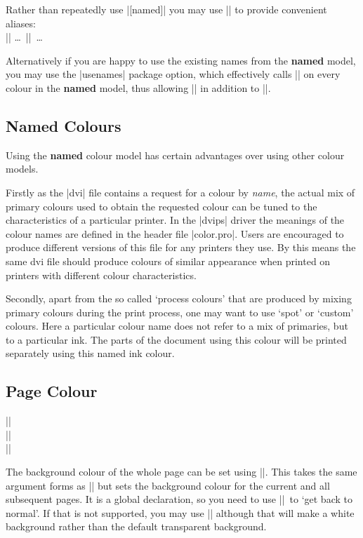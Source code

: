 Rather than repeatedly use |[named]| you may use |\definecolor| to
provide convenient aliases:\\
||
     \ldots\ |\color{myred}|\ \ldots

Alternatively if you are happy to use the existing names from the
\textbf{named} model, you may use the |usenames| package option, which
effectively calls |\definecolor| on every colour in the \textbf{named}
model, thus allowing |\color{WildStrawberry}| in addition to
|\color[named]{WildStrawbery}|.

\subsection{Named Colours}
Using the \textbf{named} colour model has certain advantages over
using other colour models.

Firstly as the |dvi| file contains a request
for a colour by \emph{name}, the actual mix of primary colours used to
obtain the requested colour can be tuned to the characteristics of a
particular printer. In the |dvips| driver the meanings of the colour
names are defined in the header file |color.pro|. Users are encouraged
to produce different versions of this file for any printers they use. By
this means the same dvi file should produce colours of similar
appearance when printed on printers with different colour
characteristics.

Secondly, apart from the so called `process colours' that are produced
by mixing primary colours during the print process, one may want to use
`spot' or `custom' colours. Here a particular colour name does not
refer to a mix of primaries, but to a particular ink. The parts of the
document using this colour will be printed separately using this named
ink colour.

\subsection{Page Colour}


\begin{decl}
|\pagecolor|\\
|\pagecolor|\\
|\nopagecolor|
\end{decl}

The background colour of the whole page can be set using
|\pagecolor|. This takes the same argument forms as |\color| but sets
the background colour for the current and all subsequent pages. It is
a global declaration, so you need to  use
|\nopagecolor|\ to `get back to normal'.
If that is not supported, you may use |\pagecolor{white}| although that
will make a white background rather than the default transparent background.

